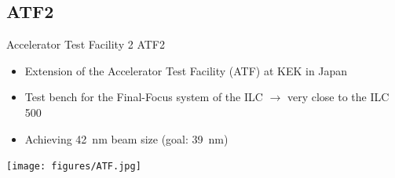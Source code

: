 \documentclass[xcolor={dvipsnames}]{beamer}
\begin{document}
\subsection{ATF2}
\begin{frame}{Accelerator Test Facility 2}
ATF2
\begin{itemize}
\item Extension of the Accelerator Test Facility (ATF) at KEK in Japan
\item Test bench for the Final-Focus system of the ILC $\rightarrow$ very close to the ILC 500
\item Achieving \SI{42}{\nano\metre} beam size (goal: \SI{39}{\nano\metre})
\end{itemize}
\vspace*{0.3cm}
\begin{center}
 	\texttt{[image: figures/ATF.jpg]}
\end{center}

\end{frame}
\end{document}
